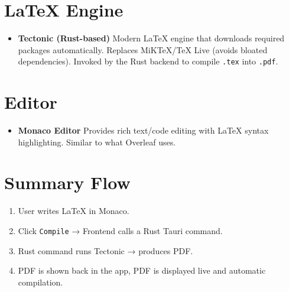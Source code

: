 \documentclass[12pt,a4paper]{article}
\begin{document}
\section*{LaTeX Engine}
\begin{itemize}
    \item \textbf{Tectonic (Rust-based)}  
    Modern LaTeX engine that downloads required packages automatically.  
    Replaces MiKTeX/TeX Live (avoids bloated dependencies).  
    Invoked by the Rust backend to compile \texttt{.tex} into \texttt{.pdf}.
\end{itemize}

\section*{Editor}
\begin{itemize}
    \item \textbf{Monaco Editor}
    Provides rich text/code editing with LaTeX syntax highlighting.  
    Similar to what Overleaf uses.
\end{itemize}

\section*{Summary Flow}
\begin{enumerate}
    \item User writes LaTeX in Monaco.
    \item Click \texttt{Compile} → Frontend calls a Rust Tauri command.
    \item Rust command runs Tectonic → produces PDF.
    \item PDF is shown back in the app, PDF is displayed live and automatic compilation.
\end{enumerate}
\end{document}
